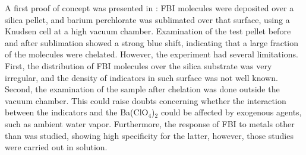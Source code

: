 \documentclass[aps,prl,reprint,longbibliography,superscriptaddress, english]{revtex4-1}
\begin{document}


A first proof of concept was presented in \cite{rivilla_fluorescent_2020}: FBI molecules were deposited over a silica pellet, and barium perchlorate was sublimated over that surface, using a Knudsen cell at a high vacuum chamber. Examination of the test pellet before and after sublimation showed a strong blue shift, indicating that a large fraction of the molecules were chelated. However, the experiment had several limitations. First, the distribution of FBI molecules over the silica substrate was very irregular, and the density of indicators in such surface was not well known. Second, the examination of the sample after chelation was done outside the vacuum chamber. This could raise doubts concerning whether the interaction between the indicators and the Ba(ClO$_4$)$_2$ could be affected by exogenous agents, such as ambient water vapor.  Furthermore, the response of FBI to metals other than \Bapp was studied, showing high specificity for the latter, however, those studies were carried out in solution.
\end{document}
